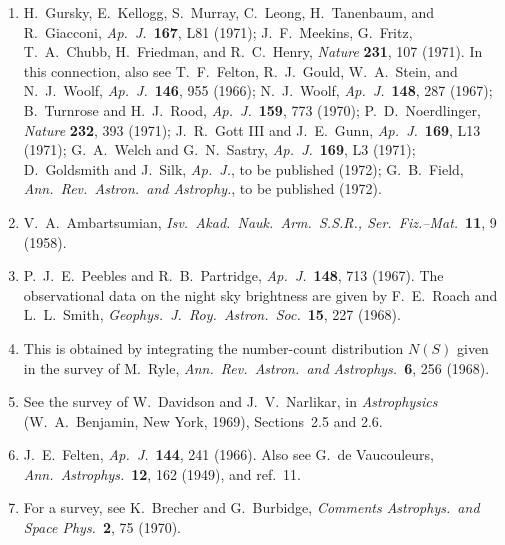 \begin{enumerate}
  \item[8a.]\label{ch15-ref-8a}
  H.~Gursky, E.~Kellogg, S.~Murray, C.~Leong, H.~Tanenbaum, and
  R.~Giacconi, \emph{Ap.\ J.}\ \textbf{167}, L81 (1971);
  J.~F.~Meekins, G.~Fritz, T.~A.~Chubb, H.~Friedman, and R.~C.~Henry,
  \emph{Nature} \textbf{231}, 107 (1971).
  In this connection, also see T.~F.~Felton, R.~J.~Gould, W.~A.~Stein,
  and N.~J.~Woolf, \emph{Ap.\ J.}\ \textbf{146}, 955 (1966);
  N.~J.~Woolf, \emph{Ap.\ J.}\ \textbf{148}, 287 (1967);
  B.~Turnrose and H.~J.~Rood, \emph{Ap.\ J.}\ \textbf{159}, 773 (1970);
  P.~D.~Noerdlinger, \emph{Nature} \textbf{232}, 393 (1971);
  J.~R.~Gott III and J.~E.~Gunn, \emph{Ap.\ J.}\ \textbf{169}, L13 (1971);
  G.~A.~Welch and G.~N.~Sastry, \emph{Ap.\ J.}\ \textbf{169}, L3 (1971);
  D.~Goldsmith and J.~Silk, \emph{Ap.\ J.}, to be published (1972);
  G.~B.~Field, \emph{Ann.\ Rev.\ Astron.\ and Astrophy.}, to be published
  (1972).

  \item{}\label{ch15-ref-9}
  V.~A.~Ambartsumian,
  \emph{Isv.\ Akad.\ Nauk.\ Arm.\ S.S.R., Ser.\ Fiz.--Mat.}\
  \textbf{11}, 9 (1958).

  \item[9a.]\label{ch15-ref-9a}
  P.~J.~E.~Peebles and R.~B.~Partridge,
  \emph{Ap.\ J.}\ \textbf{148}, 713 (1967).
  The observational data on the night sky brightness are given by
  F.~E.~Roach and L.~L.~Smith,
  \emph{Geophys.\ J.\ Roy.\ Astron.\ Soc.}\ \textbf{15}, 227 (1968).

  \item{}\label{ch15-ref-10}
  This is obtained by integrating the number-count distribution \(N(S)\)
  given in the survey of M.~Ryle,
  \emph{Ann.\ Rev.\ Astron.\ and Astrophys.}\ \textbf{6}, 256 (1968).

  \item{}\label{ch15-ref-11}
  See the survey of W.~Davidson and J.~V.~Narlikar, in
  \emph{Astrophysics} (W.~A.~Benjamin, New York, 1969),
  Sections~2.5 and 2.6.

  \item{}\label{ch15-ref-12}
  J.~E.~Felten, \emph{Ap.\ J.}\ \textbf{144}, 241 (1966).
  Also see G.~de Vaucouleurs, \emph{Ann.\ Astrophys.}\ \textbf{12},
  162 (1949), and ref.~11.

  \item{}\label{ch15-ref-13}
  For a survey, see K.~Brecher and G.~Burbidge,
  \emph{Comments Astrophys.\ and Space Phys.}\ \textbf{2}, 75 (1970).


\end{enumerate}
